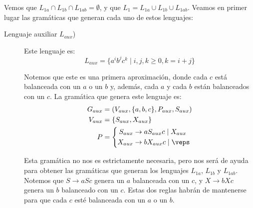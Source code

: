 \begin{ejercicio}
\begin{enumerate}
        Vemos que $L_{1a}\cap L_{1b}\cap L_{1ab}=\emptyset$, y que $L_1=L_{1a}\cup L_{1b}\cup L_{1ab}$. Veamos en primer lugar las gramáticas que generan cada uno de estos lenguajes:
        \begin{description}
            \item[Lenguaje auxiliar $L_{aux}$)] Este lenguaje es:
            \begin{equation*}
                L_{aux}=\{a^i b^j c^k \mid i,j,k\geq 0, k=i+j\}
            \end{equation*}

            Notemos que este es una primera aproximación, donde cada $c$ está balanceada con un $a$ o un $b$ y, además, cada $a$ y cada $b$ están balanceados con un $c$. La gramática que genera este lenguaje es:
            \begin{equation*}
                \begin{aligned}
                    G_{aux} &= (V_{aux},\{a,b,c\},P_{aux},S_{aux}) \\
                    V_{aux} &= \{ S_{aux}, X_{aux} \} \\
                    P &= \left\{
                        \begin{aligned}
                            S_{aux} &\rightarrow aS_{aux}c \mid X_{aux}\\
                            X_{aux} &\rightarrow bX_{aux}c \mid \veps
                        \end{aligned}
                    \right.
                \end{aligned}
            \end{equation*}

            Esta gramática no nos es estrictamente necesaria, pero nos será de ayuda para obtener las gramáticas que generan los lenguajes $L_{1a}$, $L_{1b}$ y $L_{1ab}$. Notemos que $S\rightarrow aSc$ genera un $a$ balanceada con un $c$, y $X\rightarrow bXc$ genera un $b$ balanceado con un $c$. Estas dos reglas habrán de mantenerse para que cada $c$ esté balanceada con un $a$ o un $b$.



\end{description}
\end{enumerate}
\end{ejercicio}
